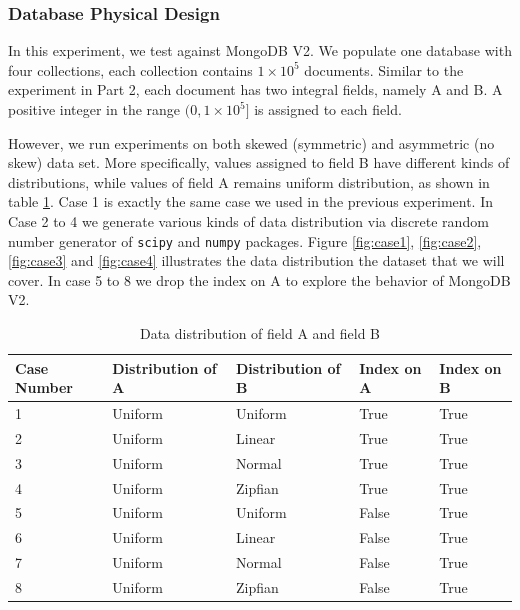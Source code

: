 \subsubsection{Database Physical Design}
In this experiment, we test against MongoDB V2. We populate
one database with four collections, each collection contains
$1 \times 10^5$ documents. Similar to the experiment in Part 2,
each document has two integral fields, namely A and B. A 
positive integer in the range $(0, 1\times 10^5]$ is assigned
to each field.

However, we run experiments on both skewed (symmetric) and 
asymmetric (no skew) data set. More specifically, values 
assigned to field B have different kinds of distributions,
while values of field A remains uniform distribution, as 
shown in table \ref{table:data-dist}. Case 1 is exactly the same 
case we used in the previous experiment.
In Case 2 to 4 we generate various kinds of data distribution 
via discrete random number generator of \verb|scipy| and 
\verb|numpy| packages. Figure \ref{fig:case1}, \ref{fig:case2}, 
\ref{fig:case3} and \ref{fig:case4} illustrates the data 
distribution the dataset that we will cover. In case 5 to 
8 we drop the index on A to explore the behavior of MongoDB V2.

\begin{table}[h]
\begin{tabular}{lllll}
    \toprule
    Case Number & Distribution of A & Distribution of B & Index on A & Index on B \\ 
    \midrule
    1           & Uniform           & Uniform           & True       & True       \\
    2           & Uniform           & Linear            & True       & True       \\
    3           & Uniform           & Normal            & True       & True       \\
    4           & Uniform           & Zipfian           & True       & True       \\
    5           & Uniform           & Uniform           & False      & True       \\
    6           & Uniform           & Linear            & False      & True       \\
    7           & Uniform           & Normal            & False      & True       \\
    8           & Uniform           & Zipfian           & False      & True      \\
    \bottomrule
    \end{tabular}
    \caption{Data distribution of field A and field B}
    \label{table:data-dist}
\end{table}

